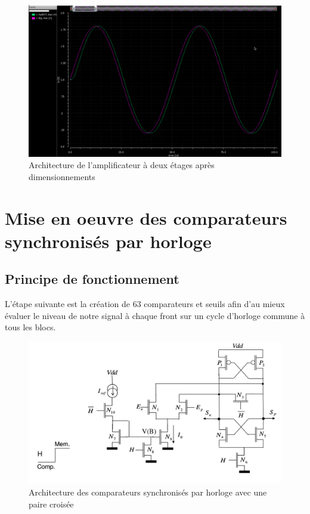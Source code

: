 \documentclass[11pt]{article}
\begin{document}
\begin{figure}[!htb]
\begin{center}
  \includegraphics[width=\linewidth]{reponse_ampli.png}
  \caption{Architecture de l'amplificateur \`a deux \'etages apr\`es dimensionnements}
\end{center}
\end{figure}


\clearpage

\section{Mise en oeuvre des comparateurs synchronis\'es par horloge}
\subsection{Principe de fonctionnement}
L'\'etape suivante est la cr\'eation de 63 comparateurs et seuils afin d'au mieux \'evaluer le niveau de
notre signal \`a chaque front sur un cycle d'horloge commune \`a tous les blocs.

\begin{figure}[!htb]
\begin{center}
  \includegraphics[scale=0.38]{comparateur_schema.jpg}
  \caption{Architecture des comparateurs synchronis\'es par horloge avec une paire crois\'ee}
\end{center}
\end{figure}
\end{document}
